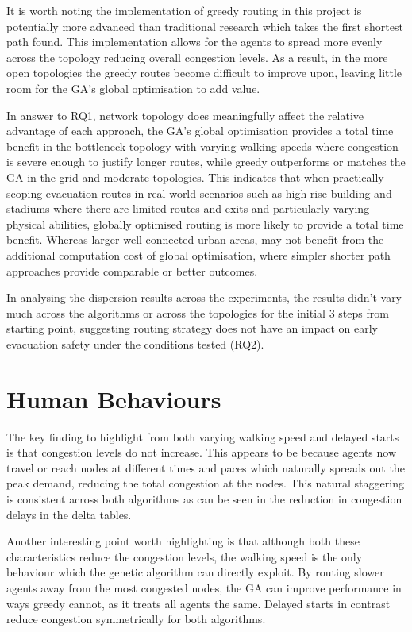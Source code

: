 \documentclass[12pt,a4paper]{report}
\begin{document}
It is worth noting the implementation of greedy routing in this project is potentially more advanced than traditional research which takes the first shortest path found. This implementation allows for the agents to spread more evenly across the topology reducing overall congestion levels. As a result, in the more open topologies the greedy routes become difficult to improve upon, leaving little room for the GA’s global optimisation to add value.

In answer to RQ1, network topology does meaningfully affect the relative advantage of each approach, the GA’s global optimisation provides a total time benefit in the bottleneck topology with varying walking speeds where congestion is severe enough to justify longer routes, while greedy outperforms or matches the GA in the grid and moderate topologies. This indicates that when practically scoping evacuation routes in real world scenarios such as high rise building and stadiums where there are limited routes and exits and particularly varying physical abilities, globally optimised routing is more likely to provide a total time benefit. Whereas larger well connected urban areas, may not benefit from the additional computation cost of global optimisation, where simpler shorter path approaches provide comparable or better outcomes.

In analysing the dispersion results across the experiments, the results didn’t vary much across the algorithms or across the topologies for the initial 3 steps from starting point, suggesting routing strategy does not have an impact on early evacuation safety under the conditions tested (RQ2). 

\section{Human Behaviours}
The key finding to highlight from both varying walking speed and delayed starts is that congestion levels do not increase. This appears to be because agents now travel or reach nodes at different times and paces which naturally spreads out the peak demand, reducing the total congestion at the nodes. This natural staggering is consistent across both algorithms as can be seen in the reduction in congestion delays in the delta tables. 

Another interesting point worth highlighting is that although both these characteristics reduce the congestion levels, the walking speed is the only behaviour which the genetic algorithm can directly exploit. By routing slower agents away from the most congested nodes, the GA can improve performance in ways greedy cannot, as it treats all agents the same. Delayed starts in contrast reduce congestion symmetrically for both algorithms.
\end{document}
